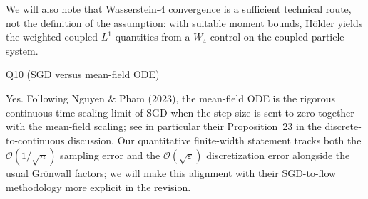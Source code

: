 We will also note that Wasserstein-$4$ convergence is a sufficient technical route, not the definition of the assumption: with suitable moment bounds, H\"older yields the weighted coupled-$L^1$ quantities from a $W_4$ control on the coupled particle system.

Q10 (SGD versus mean-field ODE)

Yes. Following Nguyen \& Pham (2023), the mean-field ODE is the rigorous continuous-time scaling limit of SGD when the step size is sent to zero together with the mean-field scaling; see in particular their Proposition~23 in the discrete-to-continuous discussion. Our quantitative finite-width statement tracks both the $\mathcal{O}(1/\sqrt{n})$ sampling error and the $\mathcal{O}(\sqrt{\varepsilon})$ discretization error alongside the usual Gr\"onwall factors; we will make this alignment with their SGD-to-flow methodology more explicit in the revision.
